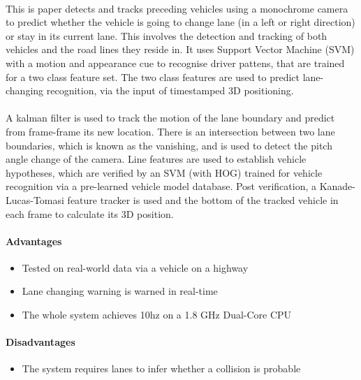 \documentclass[a4paper]{report}
\begin{document}
{\paragraph{}This is paper \citep{multi-cue} detects and tracks preceding vehicles using a monochrome camera to predict whether the vehicle is going to change lane (in a left or right direction) or stay in its current lane. This involves the detection and tracking of both vehicles and the road lines they reside in. It uses Support Vector Machine (SVM) with a motion and appearance cue to recognise driver pattens, that are trained for a two class feature set. The two class features are used to predict lane-changing recognition, via the input of timestamped 3D positioning. 

\paragraph{}A kalman filter is used to track the motion of the lane boundary and predict from frame-frame its new location. There is an intersection between two lane boundaries, which is known as the vanishing, and is used to detect the pitch angle change of the camera. Line features are used to establish vehicle hypotheses, which are verified by an SVM (with HOG) trained for vehicle recognition via a pre-learned vehicle model database. Post verification, a Kanade-Lucas-Tomasi feature tracker is used and the bottom of the tracked vehicle in each frame to calculate its 3D position.
\paragraph{Advantages}
\begin{itemize}
\item Tested on real-world data via a vehicle on a highway
\item Lane changing warning is warned in real-time
\item The whole system achieves 10hz on a 1.8 GHz Dual-Core CPU
\end{itemize}

\paragraph{Disadvantages}
\begin{itemize}
\item The system requires lanes to infer whether a collision is probable	 	
\end{itemize}

}
\end{document}
